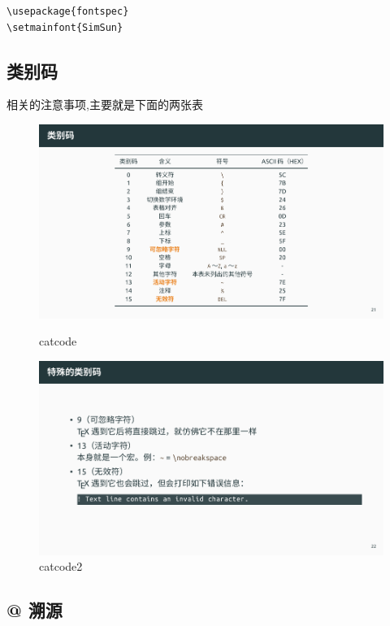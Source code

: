 \documentclass[fontset=windows, 12pt]{article}
\begin{document}
\begin{verbatim}
\usepackage{fontspec}
\setmainfont{SimSun}
\end{verbatim}


\subsection{类别码}
相关的注意事项,主要就是下面的两张表

\vspace*{6em}
\begin{figure}[!htb]
    \centering
    \includegraphics[scale=1]{catcode.pdf}
    \label{catcode}
    \caption{catcode}
\end{figure}

\begin{figure}[!htb]
    \centering
    \includegraphics[scale=1]{catcode2.pdf}
    \caption{catcode2}
    \label{catcode2}
\end{figure}

\newpage

\subsection{@ 溯源} 
\end{document}
